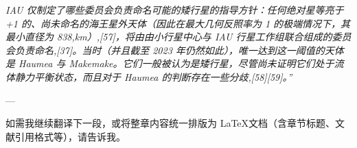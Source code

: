 \textit{IAU 仅制定了哪些委员会负责命名可能的矮行星的指导方针：任何绝对星等亮于 +1 的、尚未命名的海王星外天体（因此在最大几何反照率为 1 的极端情况下，其最小直径为 838,km）,[57]，将由由小行星中心与 IAU 行星工作组联合组成的委员会负责命名,[37]。当时（并且截至 2023 年仍然如此），唯一达到这一阈值的天体是 Haumea 与 Makemake。它们一般被认为是矮行星，尽管尚未证明它们处于流体静力平衡状态，而且对于 Haumea 的判断存在一些分歧,[58][59]。”}

---

如需我继续翻译下一段，或将整章内容统一排版为 \LaTeX 文档（含章节标题、文献引用格式等），请告诉我。



